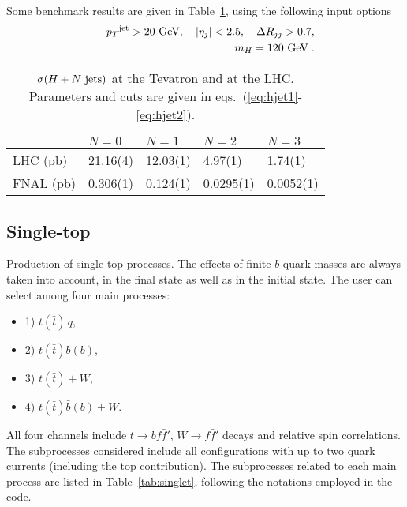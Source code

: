 \documentclass[paper]{JHEP3}
\newcommand{\gev}{\mbox{GeV}}
\newcommand{\ccaption}[2]{
    \begin{center}
    \parbox{0.85\textwidth}{
      \caption[#1]{\small{{#2}}}
      }
    \end{center}
    }
\def    \ba             {\begin{eqnarray}}
\def    \ea             {\end{eqnarray}}
\def    \gev            {\mbox{$\mathrm{GeV}$}}
\def    \pt             {\mbox{$p_T$}}
\begin{document}
Some benchmark results are given in
Table~\ref{tab:hjetxs}, using the following
input options
\ba \label{eq:hjet1}
        && \pt^{\rm jet}>20~\gev, \quad \vert \eta_j\vert < 2.5, \quad \Delta
        R_{jj} >0.7,
\\
  && m_H= 120~\gev \; .
\label{eq:hjet2}
\ea
{\renewcommand{\arraystretch}{1.2}
\begin{table}
\begin{center}
\begin{tabular}{||l|l|l|l|l||}\hline
  &  $N = 0$  & 
$N = 1$ & $N = 2$ & $N = 3$ \\ 
\hline
 LHC (pb)   & 21.16(4) & 12.03(1) & 4.97(1) & 1.74(1)\\ 
 FNAL (pb)  & 0.306(1) &0.124(1)  & 0.0295(1) & 0.0052(1)  \\
\hline
\end{tabular}            
\ccaption{}{\label{tab:hjetxs} $\sigma( H + N~{\rm jets})$
at the Tevatron and 
at the LHC. Parameters and cuts are given
in eqs.~(\ref{eq:hjet1}-\ref{eq:hjet2}).}
\end{center}
\end{table} }

\subsection{Single-top}
\label{singletop}
Production of single-top processes.
The effects of finite $b$-quark masses are always taken into account, in the final 
state as well as in the initial state. 
The user can select among four main processes: 
\begin{itemize}
\item 1) $t(\bar t) \, q$, 
\item 2) $t(\bar t) {\bar b}(b)$,
\item 3) $t(\bar t)+W$,
\item 4) $t(\bar t) {\bar b}(b)+W$.
\end{itemize}
All four channels include $t\to b f\bar{f}'$, 
  $W\to f\bar{f}'$ decays and relative spin correlations. 
The subprocesses considered include all configurations with up to two 
quark currents (including the top contribution). 
The subprocesses related to each main process are listed in 
Table~\ref{tab:singlet}, following 
the notations employed in the code. 
\end{document}
